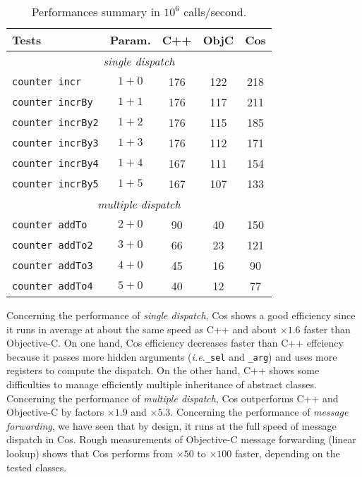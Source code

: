 \documentclass[preprint,10pt]{sigplanconf}
\newcommand{\abbrev}[1]{{\em #1}\xspace}
\newcommand{\ie}{\abbrev{i.e.}}
\newcommand{\ProgLang}[1]{{\sc #1}\xspace}
\newcommand{\Cpp}       {\ProgLang{C{\small ++}}}
\newcommand{\Cos}       {\ProgLang{Cos}}
\newcommand{\Objc}      {\ProgLang{Objective-C}}
\newcommand{\code}[1]{\lstinline[language=COS,style=samplecode]|#1|}
\begin{document}
\begin{table}
\begin{center}
{\small \begin{tabular}{l|c|ccc} \hline
\multicolumn{1}{l}{Tests}& \multicolumn{1}{l}{Param.}
                                            & \Cpp & {\sc ObjC} & \Cos \\ \hline
\multicolumn{5}{c}{{\em single dispatch}} \\
\code{counter incr}          & $1+0$        & 176  & 122        & 218  \\
\code{counter incrBy}        & $1+1$        & 176  & 117        & 211  \\
\code{counter incrBy2}       & $1+2$        & 176  & 115        & 185  \\
\code{counter incrBy3}       & $1+3$        & 176  & 112        & 171  \\
\code{counter incrBy4}       & $1+4$        & 167  & 111        & 154  \\
\code{counter incrBy5}       & $1+5$        & 167  & 107        & 133  \\ \hline
\multicolumn{5}{c}{{\em multiple dispatch}} \\
\code{counter addTo}         & $2+0$        & 90   & 40         & 150  \\
\code{counter addTo2}        & $3+0$        & 66   & 23         & 121  \\
\code{counter addTo3}        & $4+0$        & 45   & 16         & 90   \\
\code{counter addTo4}        & $5+0$        & 40   & 12         & 77   \\
\end{tabular}}
\end{center}
\caption{Performances summary in $10^6$ calls/second.\label{tbl:perf}}
\end{table}

Concerning the performance of {\em single dispatch}, \Cos shows a good efficiency since it runs in average at about the same speed as \Cpp and about $\times 1.6$ faster than \Objc. On one hand, \Cos efficiency decreases faster than \Cpp effciency because it passes more hidden arguments (\ie \code{_sel} and \code{_arg}) and uses more registers to compute the dispatch. On the other hand, \Cpp shows some difficulties to manage efficiently multiple inheritance of abstract classes.
Concerning the performance of {\em multiple dispatch}, \Cos outperforms \Cpp and \Objc by factors $\times 1.9$ and $\times 5.3$.
Concerning the performance of {\em message forwarding}, we have seen that by design, it runs at the full speed of message dispatch in \Cos. Rough measurements of \Objc message forwarding (linear lookup) shows that \Cos performs from $\times 50$ to $\times 100$ faster, depending on the tested classes.
\end{document}
